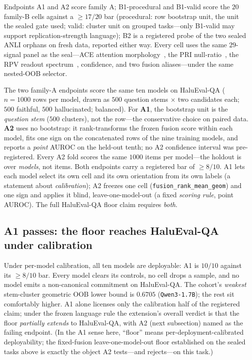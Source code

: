 \documentclass[11pt]{article}
\begin{document}
Endpoints A1 and A2 score family A; B1-procedural and B1-valid score the $20$ family-B cells
against a $\geq 17/20$ bar (procedural: row bootstrap unit, the unit the sealed gate used; valid:
cluster unit on grouped tasks---only B1-valid may support replication-strength language); B2 is a
registered probe of the two sealed ANLI orphans on fresh data, reported either way. Every cell
uses the same $29$-signal panel as the seal---ACE attention morphology~\cite{ace}, the PRI
null-ratio~\cite{pri}, the RPV readout spectrum~\cite{rpv}, confidence, and two fusion
aliases---under the same nested-OOB selector.

The two family-A endpoints score the same ten models on HaluEval-QA ($n{=}1000$ rows per model,
drawn as $500$ question stems $\times$ two candidates each; $500$ faithful, $500$ hallucinated;
balanced). For \textbf{A1},
the bootstrap unit is the \emph{question stem} ($500$ clusters), not the row---the conservative
choice on paired data. \textbf{A2} uses no bootstrap: it rank-transforms the frozen fusion score
within each model, fits one sign on the concatenated rows of the nine training models, and reports
a \emph{point} AUROC on the held-out tenth; no A2 confidence interval was pre-registered. Every A2
fold scores the same $1000$ items per model---the holdout is over \emph{models}, not items. Both
endpoints carry a registered bar of $\geq 8/10$. A1 lets each model select its own cell and its own
orientation from its own labels (a statement about \emph{calibration}); A2 freezes one cell
(\texttt{fusion\_rank\_mean\_geom}) and one sign and applies it blind, leave-one-model-out (a fixed
\emph{scoring rule}, point AUROC). The full HaluEval-QA floor claim requires \emph{both}.

\subsection{A1 passes: the floor reaches HaluEval-QA under calibration}

Under per-model calibration, all ten models are deployable: A1 is $10/10$ against its $\geq 8/10$
bar. Every model clears its controls, no cell drops a sample, and no model emits a non-canonical
commitment on HaluEval-QA. The cohort's \emph{weakest} stem-cluster geometric OOB lower bound is
$0.6705$ (\texttt{Qwen3-1.7B}); the rest sit comfortably higher. A1 alone licenses only the
calibration half of the registered claim; under the frozen language rule the extension's overall
verdict is that the floor \emph{partially extends} to HaluEval-QA, with A2 (next subsection) named
as the failing endpoint. (In the A1 sense here, ``floor'' means per-deployment-calibrated
deployability; the fixed-fusion leave-one-model-out floor established on the sealed tasks above is
exactly the object A2 tests---and rejects---on this task.)
\end{document}
